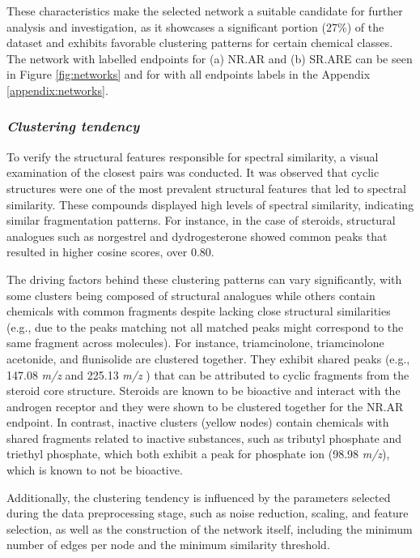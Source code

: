 These characteristics make the selected network a suitable candidate for further analysis and investigation, as it showcases a significant portion (27\%) of the dataset and exhibits favorable clustering patterns for certain chemical classes. The network with labelled endpoints for (a) NR.AR and (b) SR.ARE can be seen in Figure \ref{fig:networks} and for with all endpoints labels in the Appendix \ref{appendix:networks}.  

\subsubsection*{\textit{Clustering tendency}}

To verify the structural features responsible for spectral similarity, a visual examination of the closest pairs was conducted. It was observed that cyclic structures were one of the most prevalent structural features that led to spectral similarity. These compounds displayed high levels of spectral similarity, indicating similar fragmentation patterns. For instance, in the case of steroids, structural analogues such as norgestrel and dydrogesterone showed common peaks that resulted in higher cosine scores, over 0.80.

The driving factors behind these clustering patterns can vary significantly, with some clusters being composed of structural analogues while others contain chemicals with common fragments despite lacking close structural similarities (e.g., due to the peaks matching not all matched peaks might correspond to the same fragment across molecules).  For instance, triamcinolone, triamcinolone acetonide, and flunisolide are clustered together. They exhibit shared peaks (e.g., 147.08 \textit{m/z}  and 225.13 \textit{m/z} ) that can be attributed to cyclic fragments from the steroid core structure. Steroids are known to be bioactive and interact with the androgen receptor\cite{Gao2005} and they were shown to be clustered together for the NR.AR endpoint. In contrast, inactive clusters (yellow nodes) contain chemicals with shared fragments related to inactive substances, such as tributyl phosphate and triethyl phosphate, which both exhibit a peak for phosphate ion (98.98 \textit{m/z}), which is known to not be bioactive.

Additionally, the clustering tendency is influenced by the parameters selected during the data preprocessing stage, such as noise reduction, scaling, and feature selection, as well as the construction of the network itself, including the minimum number of edges per node and the minimum similarity threshold. 

